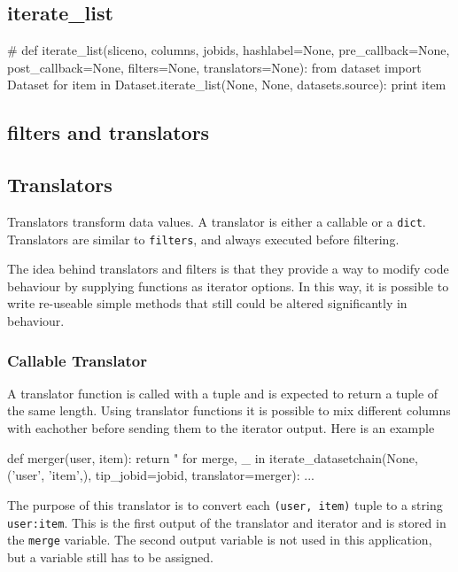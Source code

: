 \subsection{iterate\_list}
\begin{python}
  # def iterate_list(sliceno, columns, jobids, hashlabel=None, pre_callback=None, post_callback=None, filters=None, translators=None):
  from dataset import Dataset
  for item in Dataset.iterate_list(None, None, datasets.source):
    print item
\end{python}

\subsection{filters and translators}
\subsection{Translators}

Translators transform data values. A translator is either a callable or
a \texttt{dict}.  Translators are similar to \texttt{filters}, and
always executed before filtering.

The idea behind translators and filters is that they provide a way to
modify code behaviour by supplying functions as iterator options.  In
this way, it is possible to write re-useable simple methods that still
could be altered significantly in behaviour.



\subsubsection*{Callable Translator}

A translator function is called with a tuple and is expected to return
a tuple of the same length.  Using translator functions it is possible
to mix different columns with eachother before sending them to the
iterator output.  Here is an example

\begin{python}
def merger(user, item):
    return "%
for merge, _ in iterate_datasetchain(None, ('user', 'item',), tip_jobid=jobid,
                                     translator=merger):
    ...
\end{python}
\noindent The purpose of this translator is to convert each
\texttt{(user, item)} tuple to a string \texttt{user:item}.  This is
the first output of the translator and iterator and is stored in the
\texttt{merge} variable.  The second output variable is not used in
this application, but a variable still has to be assigned.



